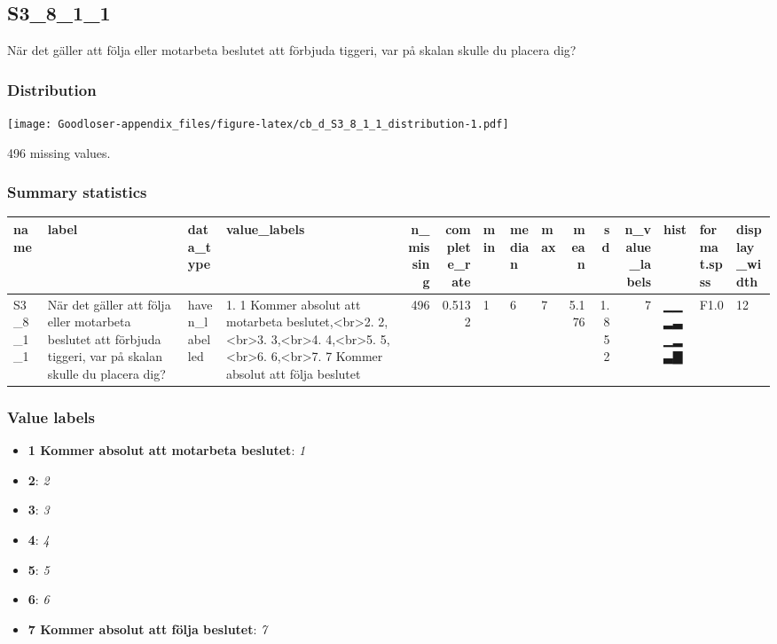 \documentclass[
]{book}
\providecommand{\tightlist}{%
  \setlength{\itemsep}{0pt}\setlength{\parskip}{0pt}}
\begin{document}
\hypertarget{S3_8_1_1}{%
\subsection{S3\_8\_1\_1}\label{S3_8_1_1}}

När det gäller att följa eller motarbeta beslutet att förbjuda tiggeri, var på skalan skulle du placera dig?

\hypertarget{S3_8_1_1_distribution}{%
\subsubsection{Distribution}\label{S3_8_1_1_distribution}}

\texttt{[image: Goodloser-appendix\_files/figure-latex/cb\_d\_S3\_8\_1\_1\_distribution-1.pdf]}

496 missing values.

\hypertarget{S3_8_1_1_summary}{%
\subsubsection{Summary statistics}\label{S3_8_1_1_summary}}

\begin{tabular}{l|l|l|l|r|r|l|l|l|r|r|r|l|l|l}
\hline
name & label & data_type & value_labels & n_missing & complete_rate & min & median & max & mean & sd & n_value_labels & hist & format.spss & display_width\\
\hline
S3_8_1_1 & När det gäller att följa eller motarbeta beslutet att förbjuda tiggeri, var på skalan skulle du placera dig? & haven_labelled & 1. 1 Kommer absolut att motarbeta beslutet,<br>2. 2,<br>3. 3,<br>4. 4,<br>5. 5,<br>6. 6,<br>7. 7 Kommer absolut att följa beslutet & 496 & 0.5132 & 1 & 6 & 7 & 5.176 & 1.852 & 7 & ▁▁▂▃▁▂▃▇ & F1.0 & 12\\
\hline
\end{tabular}

\hypertarget{S3_8_1_1_labels}{%
\subsubsection{Value labels}\label{S3_8_1_1_labels}}

\begin{itemize}
\tightlist
\item
  \textbf{1 Kommer absolut att motarbeta beslutet}: \emph{1}
\item
  \textbf{2}: \emph{2}
\item
  \textbf{3}: \emph{3}
\item
  \textbf{4}: \emph{4}
\item
  \textbf{5}: \emph{5}
\item
  \textbf{6}: \emph{6}
\item
  \textbf{7 Kommer absolut att följa beslutet}: \emph{7}
\end{itemize}
\end{document}
